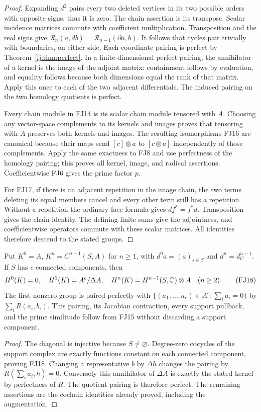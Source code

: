 \begin{proof}
Expanding $d^2$ pairs every two deleted vertices in its two possible
orders with opposite signs; thus it is zero. The chain assertion is
its transpose. Scalar incidence matrices commute with coefficient
multiplication. Transposition and the real signs give
$\mathcal R_n(a,db)=\mathcal R_{n-1}(\partial a,b)$.
It follows that cycles pair trivially with boundaries, on either side.
Each coordinate pairing is perfect by Theorem~\ref{fj:thm:perfect}.
In a finite-dimensional perfect pairing, the annihilator of a kernel
is the image of the adjoint matrix: containment follows by evaluation,
and equality follows because both dimensions equal the rank of that
matrix. Apply this once to each of the two adjacent differentials.
The induced pairing on the two homology quotients is perfect.

Every chain module in FJ14 is its scalar chain module tensored with
$A$. Choosing any vector-space complements to its kernels and images
proves that tensoring with $A$ preserves both kernels and images.
The resulting isomorphisms FJ16 are canonical because their maps send
$[c]\otimes a$ to $[c\otimes a]$ independently of those complements.
Apply the same exactness to FJ8 and use perfectness of the homology
pairing; this proves all kernel, image, and radical assertions.
Coefficientwise FJ6 gives the prime factor $p$.

For FJ17, if there is an adjacent repetition in the image chain,
the two terms deleting its equal members cancel and every other term
still has a repetition. Without a repetition the ordinary face
formula gives $df^*=f^*d$. Transposition gives the chain identity.
The defining finite sums give the adjointness, and coefficientwise
operators commute with these scalar matrices. All identities therefore
descend to the stated groups.
\end{proof}

\begin{corollary}
\label{fj:cor:augmented}
Put $K^0=A$, $K^n=C^{n-1}(S,A)$ for $n\ge1$, with
$d^0a=(a)_{s\in S}$ and $d^n=d_C^{n-1}$. If $S$ has $c$ connected
components, then
\[
 H^0(K)=0,\quad H^1(K)=A^c/\Delta A,
 \quad H^n(K)=H^{n-1}(S,\mathbb C)\otimes A\quad(n\ge2).
 \tag{FJ18}\label{fj:fj:augmented}
\]
The first nonzero group is paired perfectly with
$\{(a_1,\ldots,a_c)\in A^c:\sum_i a_i=0\}$ by
$\sum_iR(a_i,b_i)$. This pairing, its Jacobian contraction, every
support pullback, and the prime similitude follow from FJ15 without
discarding a support component.
\end{corollary}
\begin{proof}
The diagonal is injective because $S\ne\varnothing$.
Degree-zero cocycles of the support complex are exactly functions
constant on each connected component, proving FJ18. Changing a
representative $b$ by $\Delta h$ changes the pairing by
$R(\sum_i a_i,h)=0$. Conversely this annihilator of $\Delta A$
is exactly the stated kernel by perfectness of $R$. The quotient
pairing is therefore perfect. The remaining assertions are the
cochain identities already proved, including the augmentation.
\end{proof}

